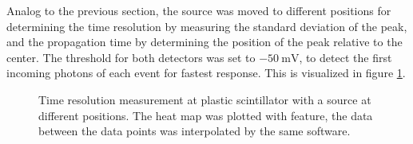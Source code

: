 Analog to the previous section, the \sr{} source was moved to different positions for determining the time resolution by measuring the standard deviation of the peak, and the propagation time by determining the position of the peak relative to the center. The threshold for both detectors was set to $\SI{-50}{\milli\volt}$, to detect the first incoming photons of each event for fastest response. 
This is visualized in figure \ref{fig:ch5:timing}. \par 
\begin{figure}[t!]
	\centering
	\hfill
	\hfill
	\hfill
	\caption[Timing reolution measurement]{Time resolution measurement at plastic scintillator with a \sr{} source at different positions. The heat map was plotted with  feature, the data between the data points was interpolated by the same software.}
	\label{fig:ch5:timing}
\end{figure}
